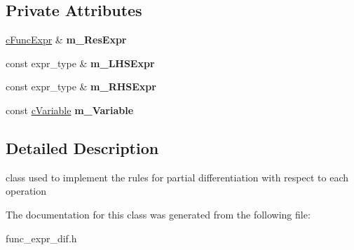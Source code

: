 \subsection*{Private Attributes}
\begin{DoxyCompactItemize}
\item 
\hypertarget{classcExprPartDiffVisitor_ad2a2466ade92e068a13622642f3a0520}{\hyperlink{classcFuncExpr}{c\-Func\-Expr} \& {\bfseries m\-\_\-\-Res\-Expr}}\label{classcExprPartDiffVisitor_ad2a2466ade92e068a13622642f3a0520}

\item 
\hypertarget{classcExprPartDiffVisitor_a8f1421d21fc39aa4018858900d933d76}{const expr\-\_\-type \& {\bfseries m\-\_\-\-L\-H\-S\-Expr}}\label{classcExprPartDiffVisitor_a8f1421d21fc39aa4018858900d933d76}

\item 
\hypertarget{classcExprPartDiffVisitor_add1ccb9fe6fab831a1da581f47e7050e}{const expr\-\_\-type \& {\bfseries m\-\_\-\-R\-H\-S\-Expr}}\label{classcExprPartDiffVisitor_add1ccb9fe6fab831a1da581f47e7050e}

\item 
\hypertarget{classcExprPartDiffVisitor_a4aa162a2faa22611e7a97b0514fbeb25}{const \hyperlink{classcVariable}{c\-Variable} {\bfseries m\-\_\-\-Variable}}\label{classcExprPartDiffVisitor_a4aa162a2faa22611e7a97b0514fbeb25}

\end{DoxyCompactItemize}


\subsection{Detailed Description}
class used to implement the rules for partial differentiation with respect to each operation 

The documentation for this class was generated from the following file\-:\begin{DoxyCompactItemize}
\item 
func\-\_\-expr\-\_\-dif.\-h\end{DoxyCompactItemize}
